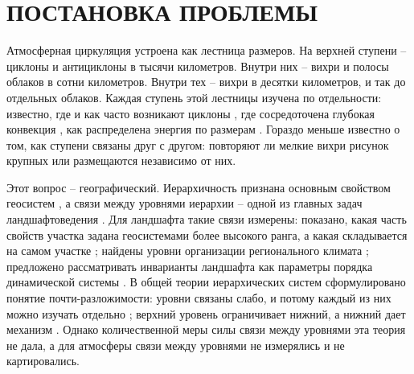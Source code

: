 \documentclass[12pt,a4paper]{article}
\begin{document}
\section{ПОСТАНОВКА ПРОБЛЕМЫ}

Атмосферная циркуляция устроена как лестница размеров. На верхней ступени -- циклоны и антициклоны в тысячи километров. Внутри них -- вихри и полосы облаков в сотни километров. Внутри тех -- вихри в десятки километров, и так до отдельных облаков. Каждая ступень этой лестницы изучена по отдельности: известно, где и как часто возникают циклоны \cite{HoskinsValdes1990,Chang2002,HoskinsHodges2005}, где сосредоточена глубокая конвекция \cite{Houze2004,Feng2021}, как распределена энергия по размерам \cite{NastromGage1985}. Гораздо меньше известно о том, как ступени связаны друг с другом: повторяют ли мелкие вихри рисунок крупных или размещаются независимо от них.

Этот вопрос -- географический. Иерархичность признана основным свойством геосистем \cite{Sochava1978,Bertrand1968}, а связи между уровнями иерархии -- одной из главных задач ландшафтоведения \cite{Puzachenko1986,Khoroshev2016}. Для ландшафта такие связи измерены: показано, какая часть свойств участка задана геосистемами более высокого ранга, а какая складывается на самом участке \cite{Khoroshev2010,Khoroshev2016}; найдены уровни организации регионального климата \cite{Krenke2019}; предложено рассматривать инварианты ландшафта как параметры порядка динамической системы \cite{Baibar2023}. В общей теории иерархических систем сформулировано понятие почти-разложимости: уровни связаны слабо, и потому каждый из них можно изучать отдельно \cite{Simon1962,SimonAndo1961}; верхний уровень ограничивает нижний, а нижний дает механизм \cite{ONeill1986,Wu1999}. Однако количественной меры силы связи между уровнями эта теория не дала, а для атмосферы связи между уровнями не измерялись и не картировались.
\end{document}

